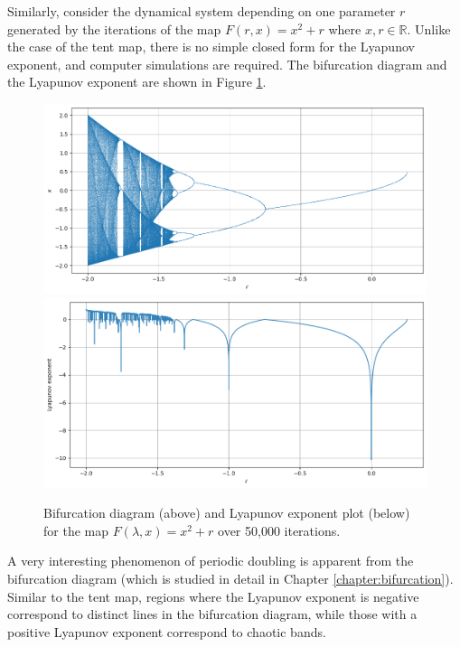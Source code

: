 \begin{exmp}
	Similarly, consider the dynamical system depending on one parameter $r$ generated by the iterations of the map
    $F(r,x)=x^2+r$ where $x,r \in \mathbb{R}$.
	Unlike the case of the tent map, there is no simple closed form for the Lyapunov exponent, and computer simulations are required. 
	The bifurcation diagram and the Lyapunov exponent are shown in Figure \ref{fig:lyapunov_x^2}.
    \begin{figure}
        \centering
        \includegraphics[width=1\linewidth]{Bifurcation Images/bifurcation_quadratic.png}
        \includegraphics[width=1\linewidth]{Bifurcation Images/lypaunov_quadratic.png}
        \caption{Bifurcation diagram (above) and Lyapunov exponent plot (below) for the map $F(\lambda,x)=x^2+r$ over 50,000 iterations.}
        \label{fig:lyapunov_x^2}
    \end{figure}
	A very interesting phenomenon of periodic doubling is apparent from the bifurcation diagram (which is studied in detail in Chapter \ref{chapter:bifurcation}).
	Similar to the tent map, regions where the Lyapunov exponent is negative correspond to distinct lines in the bifurcation diagram, while those with a positive Lyapunov exponent correspond to chaotic bands.
\end{exmp}


